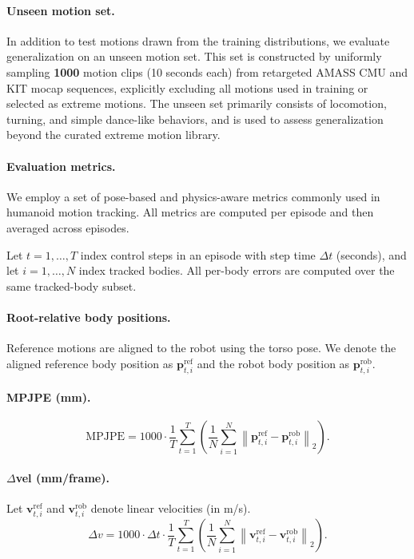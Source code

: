 \paragraph{Unseen motion set.}
In addition to test motions drawn from the training distributions, we evaluate generalization
on an unseen motion set.
This set is constructed by uniformly sampling \textbf{1000} motion clips (10 seconds each)
from retargeted AMASS CMU and KIT mocap sequences, explicitly excluding all motions used in
training or selected as extreme motions.
The unseen set primarily consists of locomotion, turning, and simple dance-like behaviors,
and is used to assess generalization beyond the curated extreme motion library.

\paragraph{Evaluation metrics.}
We employ a set of pose-based and physics-aware metrics commonly used in humanoid motion
tracking.
All metrics are computed per episode and then averaged across episodes.

Let $t = 1, \dots, T$ index control steps in an episode with step time $\Delta t$ (seconds),
and let $i = 1, \dots, N$ index tracked bodies.
All per-body errors are computed over the same tracked-body subset.

\paragraph{Root-relative body positions.}
Reference motions are aligned to the robot using the torso pose.
We denote the aligned reference body position as $\mathbf{p}^{\text{ref}}_{t,i}$
and the robot body position as $\mathbf{p}^{\text{rob}}_{t,i}$.

\paragraph{MPJPE (mm).}
\begin{equation}
\mathrm{MPJPE} =
1000 \cdot \frac{1}{T} \sum_{t=1}^{T}
\left(
\frac{1}{N} \sum_{i=1}^{N}
\left\|
\mathbf{p}^{\text{ref}}_{t,i} -
\mathbf{p}^{\text{rob}}_{t,i}
\right\|_2
\right).
\end{equation}

\paragraph{$\Delta$vel (mm/frame).}
Let $\mathbf{v}^{\text{ref}}_{t,i}$ and $\mathbf{v}^{\text{rob}}_{t,i}$ denote linear velocities
(in m/s).
\begin{equation}
\Delta v =
1000 \cdot \Delta t \cdot \frac{1}{T} \sum_{t=1}^{T}
\left(
\frac{1}{N} \sum_{i=1}^{N}
\left\|
\mathbf{v}^{\text{ref}}_{t,i} -
\mathbf{v}^{\text{rob}}_{t,i}
\right\|_2
\right).
\end{equation}

